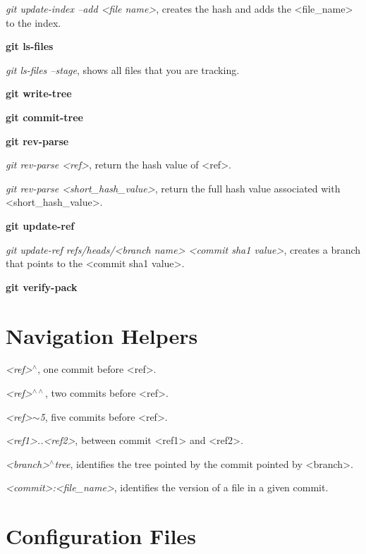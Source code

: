 \begin{refsection}
\noindent \emph{git update-index --add <file name>}, creates the hash and adds the <file\_name> to the index.

\vspace*{5mm} \noindent \textbf{git ls-files}

\noindent \emph{git ls-files --stage}, shows all files that you are tracking.

\vspace*{5mm} \noindent \textbf{git write-tree}

\vspace*{5mm} \noindent \textbf{git commit-tree}

\vspace*{5mm} \vspace*{5mm} \noindent \textbf{git rev-parse}

\noindent \emph{git rev-parse <ref>}, return the hash value of <ref>.

\noindent \emph{git rev-parse <short\_hash\_value>}, return the full hash value associated with <short\_hash\_value>.


\vspace*{5mm} \noindent \textbf{git update-ref}

\noindent \emph{git update-ref refs/heads/<branch name> <commit sha1 value>}, creates a branch that points to the <commit sha1 value>.

\vspace*{5mm} \noindent \textbf{git verify-pack}

\section{Navigation Helpers}

\noindent \emph{<ref>$^{\wedge}$}, one commit before <ref>.

\noindent \emph{<ref>$^{\wedge \wedge}$}, two commits before <ref>.

\noindent \emph{<ref>$\sim$5}, five commits before <ref>.

\noindent \emph{<ref1>..<ref2>}, between commit <ref1> and <ref2>.

\noindent \emph{<branch>$^{\wedge}${tree}}, identifies the tree pointed by the commit pointed by <branch>.

\noindent \emph{<commit>:<file\_name>}, identifies the version of a file in a given commit.

\section{Configuration Files}


\end{refsection}
